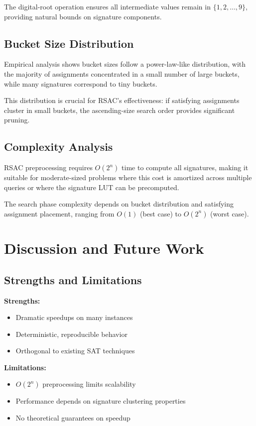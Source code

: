 \documentclass[conference]{IEEEtran}
\begin{document}
The digital-root operation ensures all intermediate values remain in $\{1, 2, \ldots, 9\}$, providing natural bounds on signature components.

\subsection{Bucket Size Distribution}

Empirical analysis shows bucket sizes follow a power-law-like distribution, with the majority of assignments concentrated in a small number of large buckets, while many signatures correspond to tiny buckets.

This distribution is crucial for RSAC's effectiveness: if satisfying assignments cluster in small buckets, the ascending-size search order provides significant pruning.

\subsection{Complexity Analysis}

RSAC preprocessing requires $O(2^n)$ time to compute all signatures, making it suitable for moderate-sized problems where this cost is amortized across multiple queries or where the signature LUT can be precomputed.

The search phase complexity depends on bucket distribution and satisfying assignment placement, ranging from $O(1)$ (best case) to $O(2^n)$ (worst case).

\section{Discussion and Future Work}

\subsection{Strengths and Limitations}

\textbf{Strengths:}
\begin{itemize}
\item Dramatic speedups on many instances
\item Deterministic, reproducible behavior
\item Orthogonal to existing SAT techniques
\end{itemize}

\textbf{Limitations:}
\begin{itemize}
\item $O(2^n)$ preprocessing limits scalability
\item Performance depends on signature clustering properties
\item No theoretical guarantees on speedup
\end{itemize}
\end{document}
